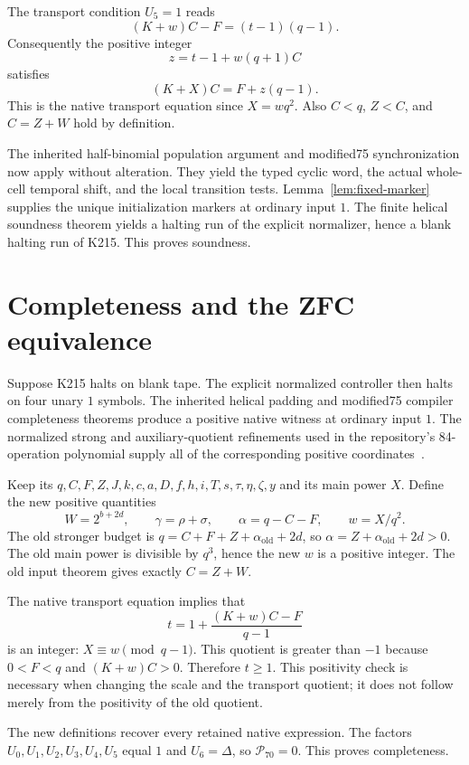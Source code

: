 \documentclass[11pt]{article}
\theoremstyle{definition}
\newcommand{\norms}{\mathcal P}
\begin{document}
The transport condition $U_5=1$ reads
\[
 (K+w)C-F=(t-1)(q-1).
\]
Consequently the positive integer
\[
 z=t-1+w(q+1)C
\]
satisfies
\[
 (K+X)C=F+z(q-1).
\]
This is the native transport equation since $X=wq^2$.
Also $C<q$, $Z<C$, and $C=Z+W$ hold by definition.

The inherited half-binomial population argument and modified75
synchronization now apply without alteration. They yield the typed cyclic
word, the actual whole-cell temporal shift, and the local transition tests.
Lemma~\ref{lem:fixed-marker} supplies the unique initialization markers at
ordinary input $1$. The finite helical soundness theorem yields a halting
run of the explicit normalizer, hence a blank halting run of K215. This
proves soundness.

\section{Completeness and the ZFC equivalence}
\label{sec:completeness}

Suppose K215 halts on blank tape. The explicit normalized controller then
halts on four unary $1$ symbols. The inherited helical padding and modified75
compiler completeness theorems produce a positive native witness at ordinary
input $1$. The normalized strong and auxiliary-quotient refinements used in
the repository's 84-operation polynomial supply all of the corresponding
positive coordinates~\cite{Universal84,Bezout}.

Keep its $q,C,F,Z,J,k,c,a,D,f,h,i,T,s,\tau,\eta,\zeta,y$ and its main
power $X$. Define the new positive quantities
\[
 W=2^{b+2d},\qquad
 \gamma=\rho+\sigma,\qquad
 \alpha=q-C-F,\qquad
 w=X/q^2.
\]
The old stronger budget is
$q=C+F+Z+\alpha_{\mathrm{old}}+2d$, so
$\alpha=Z+\alpha_{\mathrm{old}}+2d>0$.
The old main power is divisible by $q^3$, hence the new $w$ is a positive
integer. The old input theorem gives exactly $C=Z+W$.

The native transport equation implies that
\[
 t=1+\frac{(K+w)C-F}{q-1}
\]
is an integer: $X\equiv w\pmod{q-1}$. This quotient is greater than $-1$
because $0<F<q$ and $(K+w)C>0$. Therefore $t\geq1$.
This positivity check is necessary when changing the scale and the transport
quotient; it does not follow merely from the positivity of the old quotient.

The new definitions recover every retained native expression. The factors
$U_0,U_1,U_2,U_3,U_4,U_5$ equal $1$ and $U_6=\Delta$, so
$\norms_{70}=0$. This proves completeness.
\end{document}

